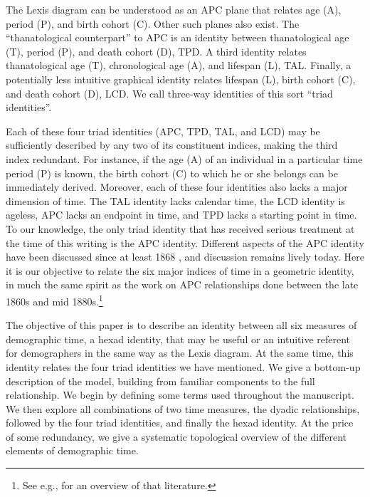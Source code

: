 \documentclass[12pt,oneside,letter]{article} %
\begin{document}
The Lexis diagram can be understood as an APC plane
that relates age (A), period (P), and birth cohort (C). Other such planes also
exist. The ``thanatological counterpart'' to APC is an identity between
thanatological age (T), period (P), and death cohort (D), TPD. A third identity
relates thanatological age (T), chronological age (A), and lifespan (L), TAL. Finally, a potentially less
intuitive graphical identity relates lifespan (L), birth cohort (C), and death
cohort (D), LCD. We call three-way identities of this sort ``triad identities''.

Each of these four triad identities (APC, TPD, TAL, and LCD) may be sufficiently described by any two of its constituent indices, making the third index redundant. For instance, if the age (A) of an individual in a particular time period (P) is known, the birth cohort (C) to which he or she belongs can be immediately derived. Moreover, each of these four identities also lacks a major dimension of time. The TAL identity lacks calendar time, the LCD identity is ageless, APC lacks an endpoint in time, and TPD lacks a starting point in time.
To our knowledge, the only triad identity that has received serious
treatment at the time of this writing is the APC identity. Different
aspects of the APC identity have been discussed since at least 1868
\citep{knapp1868ermittlung}, and discussion remains lively today. Here it is our
objective to relate the six major indices of time in a geometric identity, in
much the same spirit as the work on APC relationships done between the late
1860s and mid 1880s.\footnote{See e.g., \citet{keiding2011age} for an overview of that literature.} 

The objective of this paper is to describe an identity between all six measures
of demographic time, a hexad identity, that may be useful or an intuitive
referent for demographers in the same way as the Lexis diagram. At the same time, this identity relates the
four triad identities we have mentioned. We give a bottom-up
description of the model, building from familiar components to the full relationship. We begin by defining some terms used
throughout the manuscript. We then explore all combinations of two time
measures, the dyadic relationships, followed by the four triad identities, and
finally the hexad identity. At the price of some redundancy, we give a systematic topological overview of the
different elements of demographic time. 
\end{document}
